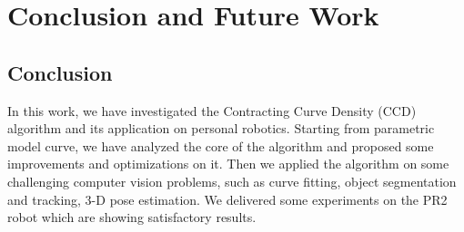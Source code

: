 
\chapter{Conclusion and  Future Work}
\label{chapter:conclusion}

\section{Conclusion}
\label{sec:con}

In this work, we have investigated the Contracting Curve Density (CCD)
algorithm and its application on personal robotics. Starting from
parametric model curve, we have analyzed the core of the algorithm and
proposed some improvements and optimizations on it. Then we applied the
algorithm on some challenging computer vision problems, such as curve
fitting, object segmentation and tracking, 3-D pose estimation. We
delivered some experiments on the PR2 robot which are showing satisfactory results. 


